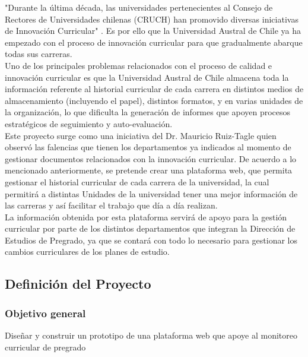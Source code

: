 	"Durante la última década, las universidades pertenecientes al Consejo de Rectores de Universidades chilenas (CRUCH) 
	han promovido diversas iniciativas de Innovación Curricular" \cite{INN11}. Es por ello que la Universidad Austral de 
	Chile ya ha empezado con el proceso de innovación curricular para que gradualmente abarque todas sus carreras.
	\\
	
	Uno de los principales problemas relacionados con el proceso de calidad e innovación curricular es que la Universidad 
	Austral de Chile almacena toda la información referente al historial curricular de cada carrera en distintos medios 
	de almacenamiento (incluyendo el papel), distintos  formatos, y en varias unidades de la organización, lo que 
	dificulta la generación de informes que apoyen procesos estratégicos de seguimiento y auto-evaluación.
	\\
	
	Este proyecto surge como una iniciativa del Dr. Mauricio Ruiz-Tagle quien observó las falencias que tienen los 
	departamentos ya indicados al momento de gestionar documentos relacionados con la innovación curricular.  
	De acuerdo a lo mencionado anteriormente, se pretende crear una plataforma web, que permita gestionar el historial 
	curricular de cada carrera de la universidad, la cual permitirá a distintas Unidades de la universidad tener una 
	mejor información  de las carreras y así facilitar el trabajo que día a día realizan.
	\\
	
	La información obtenida por esta plataforma servirá de apoyo para la gestión curricular por parte de los distintos departamentos que integran la Dirección de Estudios de Pregrado, ya que se contará con todo lo necesario para gestionar los cambios curriculares de los planes de estudio.

	\subsection{Definición del Proyecto}
	
	\subsubsection{Objetivo general}
	
	Diseñar y construir  un prototipo de una plataforma web que apoye al monitoreo curricular de pregrado \\
	\vspace{-0.4cm}
	
